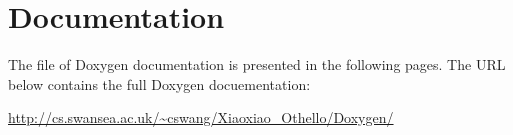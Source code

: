 \section{Documentation }

The file of Doxygen documentation is presented in the following pages. The URL below contains the full Doxygen docuementation:

\url{http://cs.swansea.ac.uk/~cswang/Xiaoxiao_Othello/Doxygen/}

%




